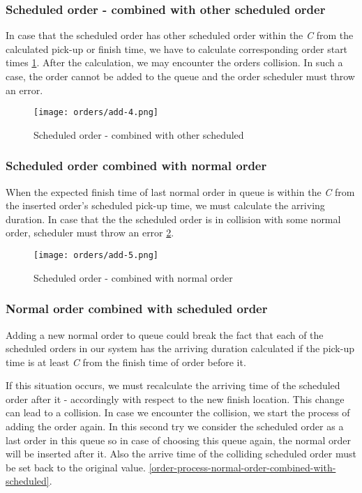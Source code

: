 	
	\subsubsection{Scheduled order - combined with other scheduled order}
			In case that the scheduled order has other scheduled order within the \textit{C} from the calculated pick-up or finish time, we have to calculate corresponding order start times \ref{order-process-scheduled-order-combined-with-scheduled}. 
			After the calculation, we may encounter the orders collision. In such a case, the order cannot be added to the queue and the order scheduler must throw an error. 
			
			\begin{figure}[h]\centering
				\texttt{[image: orders/add-4.png]}
				\caption{Scheduled order - combined with other scheduled} 
				\label{order-process-scheduled-order-combined-with-scheduled}
			\end{figure} 
		
	\subsubsection{Scheduled order combined with normal order}
		When the expected finish time of last normal order in queue is within the \textit{C} from the inserted order's scheduled pick-up time, we must calculate the arriving duration. In case that the the scheduled order is in collision with some normal order, scheduler must throw an error \ref{order-process-scheduled-order-combined-with-normal}.
		 
		\begin{figure}[h]\centering
			\texttt{[image: orders/add-5.png]}
			\caption{Scheduled order - combined with normal order} 
			\label{order-process-scheduled-order-combined-with-normal}
		\end{figure} 
	
			
	\subsubsection{Normal order combined with scheduled order}
	Adding a new normal order to queue could break the fact that each of the scheduled orders in our system has the arriving duration calculated if the pick-up time is at least \textit{C} from the finish time of order before it.
	
	If this situation occurs, we must recalculate the arriving time of the scheduled order after it -  accordingly with respect to the new finish location. This change can lead to a collision. In case we encounter the collision, we start the process of adding the order again. In this second try we consider the scheduled order as a last order in this queue so in case of choosing this queue again, the normal order will be inserted after it. Also the arrive time of the colliding scheduled order must be set back to the original value. 
	 \ref{order-process-normal-order-combined-with-scheduled}.
	
